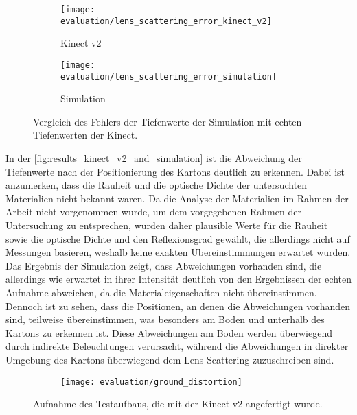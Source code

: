 \documentclass[thesis.tex]{subfiles}
\begin{document}
\begin{figure}[h!]
\centering
\begin{subfigure}[b]{0.98\textwidth}
    \centering
\end{subfigure}
\vspace{5mm}
\begin{subfigure}{0.49\textwidth}
    \texttt{[image: evaluation/lens\_scattering\_error\_kinect\_v2]}
    \caption{Kinect v2}
\end{subfigure}
\begin{subfigure}{0.49\textwidth}
    \texttt{[image: evaluation/lens\_scattering\_error\_simulation]}
    \caption{Simulation}
\end{subfigure}
\caption{Vergleich des Fehlers der Tiefenwerte der Simulation mit echten Tiefenwerten der Kinect.}
\label{fig:results_kinect_v2_and_simulation}
\end{figure}

In der \autoref{fig:results_kinect_v2_and_simulation} ist die Abweichung der Tiefenwerte nach der Positionierung des Kartons deutlich zu erkennen. Dabei ist anzumerken, dass die Rauheit und die optische Dichte der untersuchten Materialien nicht bekannt waren. Da die Analyse der Materialien im Rahmen der Arbeit nicht vorgenommen wurde, um dem vorgegebenen Rahmen der Untersuchung zu entsprechen, wurden daher plausible Werte für die Rauheit sowie die optische Dichte und den Reflexionsgrad gewählt, die allerdings nicht auf Messungen basieren, weshalb keine exakten Übereinstimmungen erwartet wurden. Das Ergebnis der Simulation zeigt, dass Abweichungen vorhanden sind, die allerdings wie erwartet in ihrer Intensität deutlich von den Ergebnissen der echten Aufnahme abweichen, da die Materialeigenschaften nicht übereinstimmen. Dennoch ist zu sehen, dass die Positionen, an denen die Abweichungen vorhanden sind, teilweise übereinstimmen, was besonders am Boden und unterhalb des Kartons zu erkennen ist. Diese Abweichungen am Boden werden überwiegend durch indirekte Beleuchtungen verursacht, während die Abweichungen in direkter Umgebung des Kartons überwiegend dem Lens Scattering zuzuschreiben sind.

\begin{figure}[h!]
\centering
\begin{subfigure}{0.49\textwidth}
    \texttt{[image: evaluation/ground\_distortion]}
\end{subfigure}
\caption{Aufnahme des Testaufbaus, die mit der Kinect v2 angefertigt wurde.}
\label{fig:ground_distortion}
\end{figure}
\end{document}
